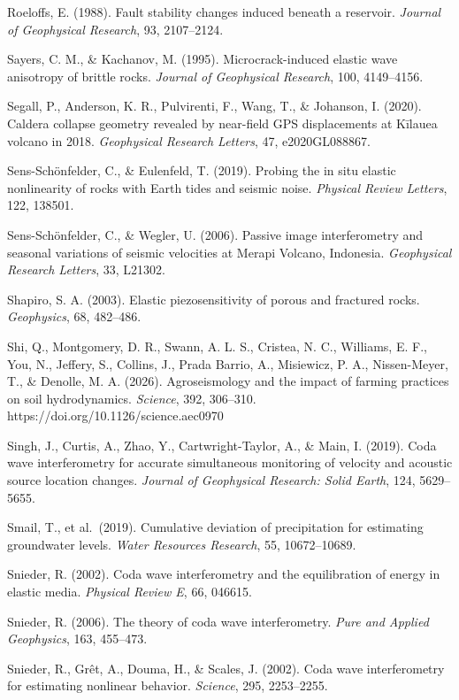 \documentclass[12pt]{article}
\begin{document}
Roeloffs, E. (1988). Fault stability changes induced beneath a
reservoir. \emph{Journal of Geophysical Research}, 93, 2107--2124.

Sayers, C. M., \& Kachanov, M. (1995). Microcrack-induced elastic wave
anisotropy of brittle rocks. \emph{Journal of Geophysical Research},
100, 4149--4156.

Segall, P., Anderson, K. R., Pulvirenti, F., Wang, T., \& Johanson, I.
(2020). Caldera collapse geometry revealed by near-field GPS
displacements at Kīlauea volcano in 2018. \emph{Geophysical Research
Letters}, 47, e2020GL088867.

Sens-Schönfelder, C., \& Eulenfeld, T. (2019). Probing the in situ
elastic nonlinearity of rocks with Earth tides and seismic noise.
\emph{Physical Review Letters}, 122, 138501.

Sens-Schönfelder, C., \& Wegler, U. (2006). Passive image interferometry
and seasonal variations of seismic velocities at Merapi Volcano,
Indonesia. \emph{Geophysical Research Letters}, 33, L21302.

Shapiro, S. A. (2003). Elastic piezosensitivity of porous and fractured
rocks. \emph{Geophysics}, 68, 482--486.

Shi, Q., Montgomery, D. R., Swann, A. L. S., Cristea, N. C., Williams,
E. F., You, N., Jeffery, S., Collins, J., Prada Barrio, A., Misiewicz,
P. A., Nissen-Meyer, T., \& Denolle, M. A. (2026). Agroseismology and
the impact of farming practices on soil hydrodynamics. \emph{Science},
392, 306--310. https://doi.org/10.1126/science.aec0970

Singh, J., Curtis, A., Zhao, Y., Cartwright-Taylor, A., \& Main, I.
(2019). Coda wave interferometry for accurate simultaneous monitoring of
velocity and acoustic source location changes. \emph{Journal of
Geophysical Research: Solid Earth}, 124, 5629--5655.

Smail, T., et al.~(2019). Cumulative deviation of precipitation for
estimating groundwater levels. \emph{Water Resources Research}, 55,
10672--10689.

Snieder, R. (2002). Coda wave interferometry and the equilibration of
energy in elastic media. \emph{Physical Review E}, 66, 046615.

Snieder, R. (2006). The theory of coda wave interferometry. \emph{Pure
and Applied Geophysics}, 163, 455--473.

Snieder, R., Grêt, A., Douma, H., \& Scales, J. (2002). Coda wave
interferometry for estimating nonlinear behavior. \emph{Science}, 295,
2253--2255.
\end{document}

